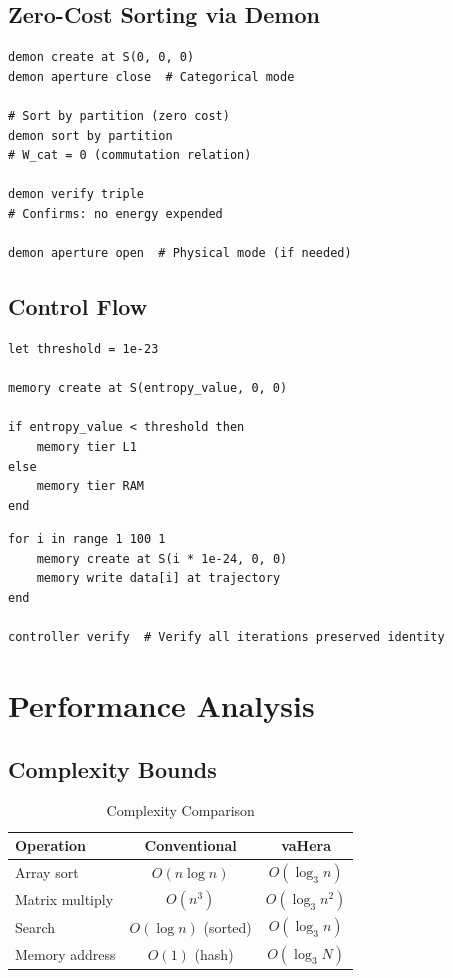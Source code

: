 \documentclass[twocolumn,10pt]{article}
\theoremstyle{definition}
\theoremstyle{remark}
\begin{document}
\subsection{Zero-Cost Sorting via Demon}

\begin{lstlisting}[caption={Demon-based zero-cost sort}]
demon create at S(0, 0, 0)
demon aperture close  # Categorical mode

# Sort by partition (zero cost)
demon sort by partition
# W_cat = 0 (commutation relation)

demon verify triple
# Confirms: no energy expended

demon aperture open  # Physical mode (if needed)
\end{lstlisting}

\subsection{Control Flow}

\begin{lstlisting}[caption={Conditional execution}]
let threshold = 1e-23

memory create at S(entropy_value, 0, 0)

if entropy_value < threshold then
    memory tier L1
else
    memory tier RAM
end
\end{lstlisting}

\begin{lstlisting}[caption={Iteration}]
for i in range 1 100 1
    memory create at S(i * 1e-24, 0, 0)
    memory write data[i] at trajectory
end

controller verify  # Verify all iterations preserved identity
\end{lstlisting}

\section{Performance Analysis}
\label{sec:performance}

\subsection{Complexity Bounds}

\begin{table}[h]
\centering
\caption{Complexity Comparison}
\begin{tabular}{lcc}
\toprule
Operation & Conventional & vaHera \\
\midrule
Array sort & $O(n \log n)$ & $O(\log_3 n)$ \\
Matrix multiply & $O(n^3)$ & $O(\log_3 n^2)$ \\
Search & $O(\log n)$ (sorted) & $O(\log_3 n)$ \\
Memory address & $O(1)$ (hash) & $O(\log_3 N)$ \\
\bottomrule
\end{tabular}
\end{table}
\end{document}
